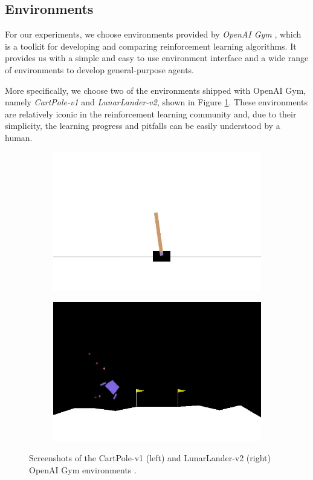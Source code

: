 \subsection{Environments}
For our experiments, we choose environments provided by \textit{OpenAI Gym} \cite{gym}, which is a toolkit for developing and comparing reinforcement learning algorithms. It provides us with a simple and easy to use environment interface and a wide range of environments to develop general-purpose agents.

More specifically, we choose two of the environments shipped with OpenAI Gym, namely \textit{CartPole-v1} and \textit{LunarLander-v2}, shown in Figure \ref{fig:environments}. These environments are relatively iconic in the reinforcement learning community and, due to their simplicity, the learning progress and pitfalls can be easily understood by a human.
\begin{figure}[b]
    \centering
    \begin{subfigure}{0.49\textwidth}
        \raggedleft
        \includegraphics[width=\textwidth]{assets/cartpole.jpg}
    \end{subfigure}
    \begin{subfigure}{0.5\textwidth}
        \raggedright
        \includegraphics[width=\textwidth]{assets/lunarlander.jpg}
    \end{subfigure}
    \caption{Screenshots of the CartPole-v1 (left) and LunarLander-v2 (right) OpenAI Gym environments \cite{gym}.}
    \label{fig:environments}
\end{figure}
